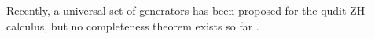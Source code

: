 Recently, a universal set of generators has been proposed for the qudit ZH-calculus, but no completeness theorem exists so far \cite{roy}.




%
%
%
